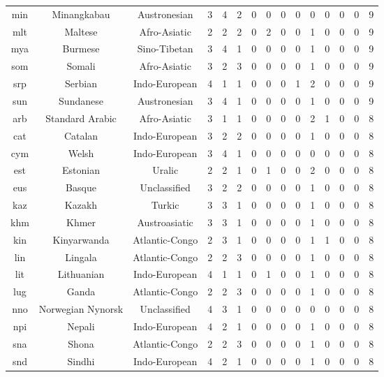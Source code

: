 \begin{longtable}{ccc|ccccccccccc|c}
    min & Minangkabau & Austronesian & 3 & 4 & 2 & 0 & 0 & 0 & 0 & 0 & 0 & 0 & 0 & 9 \\ 
    mlt & Maltese & Afro-Asiatic & 2 & 2 & 2 & 0 & 2 & 0 & 0 & 1 & 0 & 0 & 0 & 9 \\ 
    mya & Burmese & Sino-Tibetan & 3 & 4 & 1 & 0 & 0 & 0 & 0 & 1 & 0 & 0 & 0 & 9 \\ 
    som & Somali & Afro-Asiatic & 3 & 2 & 3 & 0 & 0 & 0 & 0 & 1 & 0 & 0 & 0 & 9 \\ 
    srp & Serbian & Indo-European & 4 & 1 & 1 & 0 & 0 & 0 & 1 & 2 & 0 & 0 & 0 & 9 \\ 
    sun & Sundanese & Austronesian & 3 & 4 & 1 & 0 & 0 & 0 & 0 & 1 & 0 & 0 & 0 & 9 \\ 
    arb & Standard Arabic & Afro-Asiatic & 3 & 1 & 1 & 0 & 0 & 0 & 0 & 2 & 1 & 0 & 0 & 8 \\ 
    cat & Catalan & Indo-European & 3 & 2 & 2 & 0 & 0 & 0 & 0 & 1 & 0 & 0 & 0 & 8 \\ 
    cym & Welsh & Indo-European & 3 & 4 & 1 & 0 & 0 & 0 & 0 & 0 & 0 & 0 & 0 & 8 \\ 
    est & Estonian & Uralic & 2 & 2 & 1 & 0 & 1 & 0 & 0 & 2 & 0 & 0 & 0 & 8 \\ 
    eus & Basque & Unclassified & 3 & 2 & 2 & 0 & 0 & 0 & 0 & 1 & 0 & 0 & 0 & 8 \\ 
    kaz & Kazakh & Turkic & 3 & 3 & 1 & 0 & 0 & 0 & 0 & 1 & 0 & 0 & 0 & 8 \\ 
    khm & Khmer & Austroasiatic & 3 & 3 & 1 & 0 & 0 & 0 & 0 & 1 & 0 & 0 & 0 & 8 \\ 
    kin & Kinyarwanda & Atlantic-Congo & 2 & 3 & 1 & 0 & 0 & 0 & 0 & 1 & 1 & 0 & 0 & 8 \\ 
    lin & Lingala & Atlantic-Congo & 2 & 2 & 3 & 0 & 0 & 0 & 0 & 1 & 0 & 0 & 0 & 8 \\ 
    lit & Lithuanian & Indo-European & 4 & 1 & 1 & 0 & 1 & 0 & 0 & 1 & 0 & 0 & 0 & 8 \\ 
    lug & Ganda & Atlantic-Congo & 2 & 2 & 3 & 0 & 0 & 0 & 0 & 1 & 0 & 0 & 0 & 8 \\ 
    nno & Norwegian Nynorsk & Unclassified & 4 & 3 & 1 & 0 & 0 & 0 & 0 & 0 & 0 & 0 & 0 & 8 \\ 
    npi & Nepali & Indo-European & 4 & 2 & 1 & 0 & 0 & 0 & 0 & 1 & 0 & 0 & 0 & 8 \\ 
    sna & Shona & Atlantic-Congo & 2 & 2 & 3 & 0 & 0 & 0 & 0 & 1 & 0 & 0 & 0 & 8 \\ 
    snd & Sindhi & Indo-European & 4 & 2 & 1 & 0 & 0 & 0 & 0 & 1 & 0 & 0 & 0 & 8 \\ 

\end{longtable}
